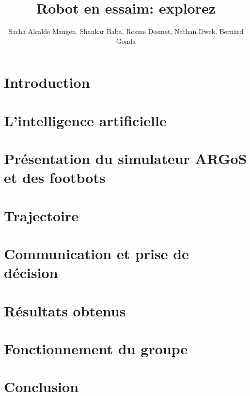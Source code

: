 \documentclass[a4paper,12pt]{report}
\title{Robot en essaim: explorez}
\author{Sacha Alcalde Mangen, Shankar Baba, Rosine Desmet, Nathan Dwek, Bernard Gonda}
\begin{document}


\begin{abstract}

\end{abstract}

\begin{abstract}

\end{abstract}

\tableofcontents

\chapter{Introduction}


\chapter{L'intelligence artificielle\label{chap:AI}}



\chapter[ARGoS et les footbots]{Présentation du simulateur ARGoS et des footbots\label{chap:argosFootbot}}



\chapter{Trajectoire}



\chapter{Communication et prise de décision}



\chapter{Résultats obtenus}



\chapter[Fonctionnement du groupe]{Fonctionnement du groupe}



\chapter{Conclusion}



\listofalgorithms


\listoffigures


\nocite{*}



\end{document}
